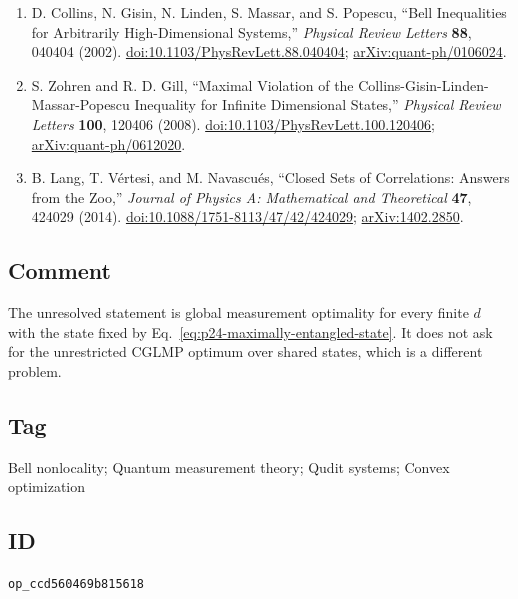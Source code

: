 \begin{enumerate}[label={},leftmargin=4.8em,labelsep=0.5em]
  \footnotesize
  \item[\textup{[CGLMP02]}]\label{ref:p24-cglmp}
  D. Collins, N. Gisin, N. Linden, S. Massar, and S. Popescu,
  ``Bell Inequalities for Arbitrarily High-Dimensional Systems,''
  \emph{Physical Review Letters} \textbf{88}, 040404 (2002).
  \href{https://doi.org/10.1103/PhysRevLett.88.040404}{doi:10.1103/PhysRevLett.88.040404};
  \href{https://arxiv.org/abs/quant-ph/0106024}{arXiv:quant-ph/0106024}.

  \item[\textup{[ZG08]}]\label{ref:p24-zohren-gill}
  S. Zohren and R. D. Gill,
  ``Maximal Violation of the Collins-Gisin-Linden-Massar-Popescu Inequality
  for Infinite Dimensional States,''
  \emph{Physical Review Letters} \textbf{100}, 120406 (2008).
  \href{https://doi.org/10.1103/PhysRevLett.100.120406}{doi:10.1103/PhysRevLett.100.120406};
  \href{https://arxiv.org/abs/quant-ph/0612020}{arXiv:quant-ph/0612020}.

  \item[\textup{[LVN14]}]\label{ref:p24-lang}
  B. Lang, T. Vértesi, and M. Navascués,
  ``Closed Sets of Correlations: Answers from the Zoo,''
  \emph{Journal of Physics A: Mathematical and Theoretical} \textbf{47},
  424029 (2014).
  \href{https://doi.org/10.1088/1751-8113/47/42/424029}{doi:10.1088/1751-8113/47/42/424029};
  \href{https://arxiv.org/abs/1402.2850}{arXiv:1402.2850}.
\end{enumerate}

\subsection*{Comment}

The unresolved statement is global measurement optimality for every finite
$d$ with the state fixed by Eq.~\eqref{eq:p24-maximally-entangled-state}.  It
does not ask for the unrestricted CGLMP optimum over shared states, which is a
different problem.

\subsection*{Tag}

Bell nonlocality; Quantum measurement theory; Qudit systems; Convex optimization

\subsection*{ID}

\texttt{op\_ccd560469b815618}
